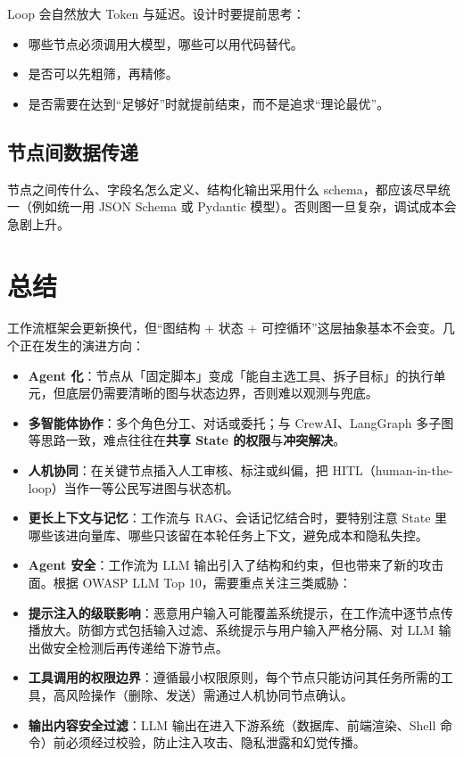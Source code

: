 \documentclass[10pt,a4paper]{ctexart}
\begin{document}
Loop 会自然放大 Token 与延迟。设计时要提前思考：


\begin{itemize}[itemsep=2pt, topsep=4pt]
  \item 哪些节点必须调用大模型，哪些可以用代码替代。
  \item 是否可以先粗筛，再精修。
  \item 是否需要在达到“足够好”时就提前结束，而不是追求“理论最优”。
\end{itemize}


\subsection{节点间数据传递}


节点之间传什么、字段名怎么定义、结构化输出采用什么 schema，都应该尽早统一（例如统一用 JSON Schema 或 Pydantic 模型）。否则图一旦复杂，调试成本会急剧上升。



\section{总结}


工作流框架会更新换代，但“图结构 + 状态 + 可控循环”这层抽象基本不会变。几个正在发生的演进方向：


\begin{itemize}[itemsep=2pt, topsep=4pt]
  \item \textbf{Agent 化}：节点从「固定脚本」变成「能自主选工具、拆子目标」的执行单元，但底层仍需要清晰的图与状态边界，否则难以观测与兜底。
  \item \textbf{多智能体协作}：多个角色分工、对话或委托；与 CrewAI、LangGraph 多子图等思路一致，难点往往在\textbf{共享 State 的权限}与\textbf{冲突解决}。
  \item \textbf{人机协同}：在关键节点插入人工审核、标注或纠偏，把 HITL（human-in-the-loop）当作一等公民写进图与状态机。
  \item \textbf{更长上下文与记忆}：工作流与 RAG、会话记忆结合时，要特别注意 State 里哪些该进向量库、哪些只该留在本轮任务上下文，避免成本和隐私失控。
  \item \textbf{Agent 安全}：工作流为 LLM 输出引入了结构和约束，但也带来了新的攻击面。根据 OWASP LLM Top 10，需要重点关注三类威胁：
  \item \textbf{提示注入的级联影响}：恶意用户输入可能覆盖系统提示，在工作流中逐节点传播放大。防御方式包括输入过滤、系统提示与用户输入严格分隔、对 LLM 输出做安全检测后再传递给下游节点。
  \item \textbf{工具调用的权限边界}：遵循最小权限原则，每个节点只能访问其任务所需的工具，高风险操作（删除、发送）需通过人机协同节点确认。
  \item \textbf{输出内容安全过滤}：LLM 输出在进入下游系统（数据库、前端渲染、Shell 命令）前必须经过校验，防止注入攻击、隐私泄露和幻觉传播。
\end{itemize}
\end{document}
